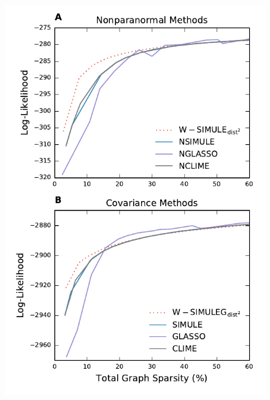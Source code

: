 \documentclass{article}
\begin{document}
\begin{figure}[ht!]
	\centering
	\includegraphics[width=\columnwidth]{../../plots/ll/ll_best.pdf}

\end{figure}
\end{document}
